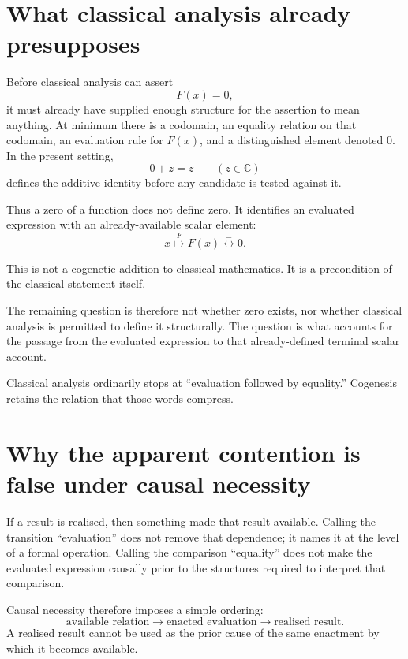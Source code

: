 \documentclass[11pt]{article}
\begin{document}
\section{What classical analysis already presupposes}

Before classical analysis can assert
\[
F(x)=0,
\]
it must already have supplied enough structure for the assertion to mean anything. At minimum there is a codomain, an equality relation on that codomain, an evaluation rule for \(F(x)\), and a distinguished element denoted \(0\). In the present setting,
\[
0+z=z
\qquad
(z\in\mathbb C)
\]
defines the additive identity before any candidate is tested against it.

Thus a zero of a function does not define zero. It identifies an evaluated expression with an already-available scalar element:
\[
x
\overset{F}{\longmapsto}
F(x)
\overset{=}{\longleftrightarrow}
0.
\]

This is not a cogenetic addition to classical mathematics. It is a precondition of the classical statement itself.

\medskip
\noindent
{}
\medskip

The remaining question is therefore not whether zero exists, nor whether classical analysis is permitted to define it structurally. The question is what accounts for the passage from the evaluated expression to that already-defined terminal scalar account.

Classical analysis ordinarily stops at ``evaluation followed by equality.'' Cogenesis retains the relation that those words compress.

\section{Why the apparent contention is false under causal necessity}

If a result is realised, then something made that result available. Calling the transition ``evaluation'' does not remove that dependence; it names it at the level of a formal operation. Calling the comparison ``equality'' does not make the evaluated expression causally prior to the structures required to interpret that comparison.

Causal necessity therefore imposes a simple ordering:
\[
\text{available relation}
\longrightarrow
\text{enacted evaluation}
\longrightarrow
\text{realised result}.
\]
A realised result cannot be used as the prior cause of the same enactment by which it becomes available.
\end{document}

